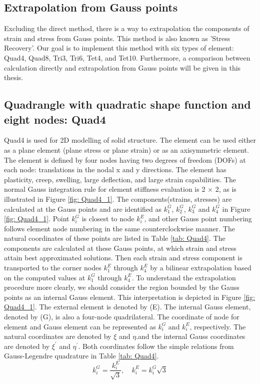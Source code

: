 \subsection{Extrapolation from Gauss points}
Excluding the direct method, there is a way to extrapolation the components of strain and stress from Gauss points. This method is also known as 'Stress Recovery'. Our goal is to implement this method with six types of element: Quad4, Quad8, Tri3, Tri6, Tet4, and Tet10. Furthermore, a comparison between calculation directly and extrapolation from Gauss points will be given in this thesis.  

\subsection{Quadrangle with quadratic shape function and eight nodes: Quad4} \label{Quad4}
Quad4 is used for 2D modelling of solid structure. The element can be used either as a plane element (plane stress or plane strain) or as an axisymmetric element. The element is defined by four nodes having two degrees of freedom (DOFs) at each node: translations in the nodal x and y directions. The element has plasticity, creep, swelling, large deflection, and large strain capabilities.  The normal Gauss integration rule for element stiffness evaluation is 2 $\times$ 2, as is illustrated in Figure \ref{fig: Quad4_1}. The components(strains, stresses) are calculated at the Gauss points and are identified as $k_1^G$, $k_2^G$, $k_3^G$ and $k_4^G$ in Figure \ref{fig: Quad4_1}. Point $k_i^G$ is closest to node $k_i^E$, and other Gauss point numbering follows element node numbering in the same counterclockwise manner. The natural coordinates of these points are listed in Table \ref{tab: Quad4}. The components are calculated at these Gauss points, at which strain and stress attain best approximated solutions. Then each strain and stress component is transported to the corner nodes $k_1^E$ through $k_4^E$ by a bilinear extrapolation based on the computed values at $k_1^G$ through $k_4^E$. To understand the extrapolation procedure more clearly, we should consider the region bounded by the Gauss points as an internal Gauss element. This interpretation is depicted in Figure \ref{fig: Quad4_1}. The external element is denoted by (E). The internal Gauss element, denoted by (G), is also a four-node quadrilateral. The coordinate of node for element and Gauss element can be represented as $k_i^G$ and $k_i^E$, respectively. The natural coordinates are denoted by $\xi$ and $\eta$.and the internal Gauss coordinates are denoted by $\xi^{\prime}$ and $\eta^{\prime}$.  Both coordinates follow the simple relations from Gauss-Legendre quadrature in Table \ref{tab: Quad4}.
\begin{equation}
k_i^G = \frac{k_i^E}{\sqrt{3}},\quad
k_i^E= k_i^G\sqrt{3}
\end{equation}

